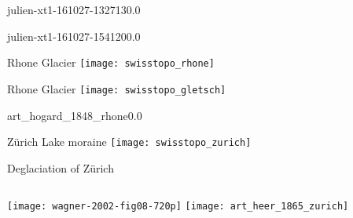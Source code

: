     \begin{backgroundframe}[b]{julien-xt1-161027-132713}{0.0}{}
    \end{backgroundframe}

    \begin{backgroundframe}[b]{julien-xt1-161027-154120}{0.0}{}
    \end{backgroundframe}

    \begin{frame}{Rhone Glacier}
      \texttt{[image: swisstopo\_rhone]}
    \end{frame}

    \begin{frame}{Rhone Glacier}
      \texttt{[image: swisstopo\_gletsch]}
    \end{frame}

    \begin{backgroundframe}[b]{art_hogard_1848_rhone}{0.0}{}
    \end{backgroundframe}

    \begin{frame}{Zürich Lake moraine}
      \texttt{[image: swisstopo\_zurich]}
    \end{frame}

    \begin{frame}{Deglaciation of Zürich}
      \begin{columns}
        \column{40mm}
          \texttt{[image: wagner-2002-fig08-720p]}
        \column{80mm}
          \texttt{[image: art\_heer\_1865\_zurich]}
      \end{columns}
    \end{frame}

